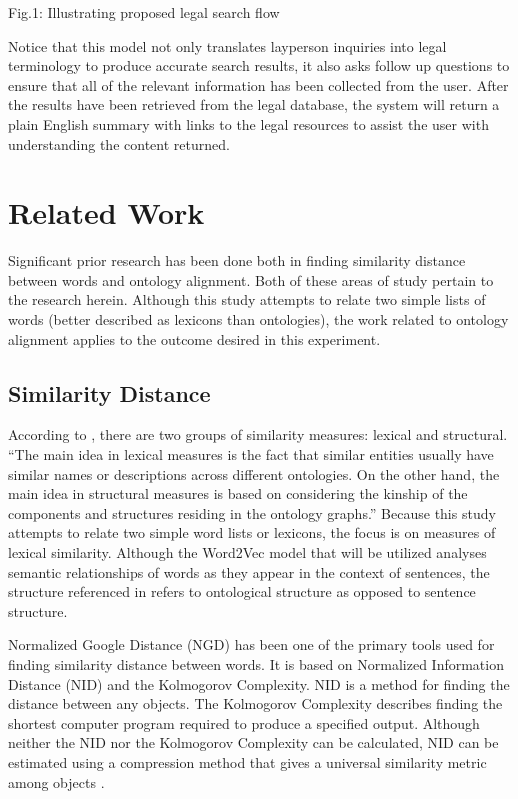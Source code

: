 \documentclass[11pt]{article}
\begin{document}
Fig.1: Illustrating proposed legal search flow

Notice that this model not only translates layperson inquiries into legal terminology to produce accurate search results, it also asks follow up questions to ensure that all of the relevant information has been collected from the user.  After the results have been retrieved from the legal database, the system will return a plain English summary with links to the legal resources to assist the user with understanding the content returned.

\section{Related Work}
Significant prior research has been done both in finding similarity distance between words and ontology alignment.  Both of these areas of study pertain to the research herein.  Although this study attempts to relate two simple lists of words (better described as lexicons than ontologies), the work related to ontology alignment applies to the outcome desired in this experiment.

\subsection{Similarity Distance}
According to \cite[p.~77]{JiangWangZheng2014}, there are two groups of similarity measures: lexical and structural.  ``The main idea in lexical measures is the fact that similar entities usually have similar names or descriptions across different ontologies.  On the other hand, the main idea in structural measures is based on considering the kinship of the components and structures residing in the ontology graphs.''  Because this study attempts to relate two simple word lists or lexicons, the focus is on measures of lexical similarity.  Although the Word2Vec model that will be utilized analyses semantic relationships of words as they appear in the context of sentences, the structure referenced in \cite{JiangWangZheng2014} refers to ontological structure as opposed to sentence structure.  

Normalized Google Distance (NGD) has been one of the primary tools used for finding similarity distance between words.  It is based on Normalized Information Distance (NID) and the Kolmogorov Complexity.  NID is a method for finding the distance between any objects.  The Kolmogorov Complexity describes finding the shortest computer program required to produce a  specified output.  Although neither the NID nor the Kolmogorov Complexity can be calculated, NID can be estimated using a compression method that gives a universal similarity metric among objects \cite{CilibrasiRudiVitanyi2004} \cite{LiMingChenXinLi2004} \cite{ChenMaZhang2009} \cite{KjosEvangelista2009}.  
\end{document}
